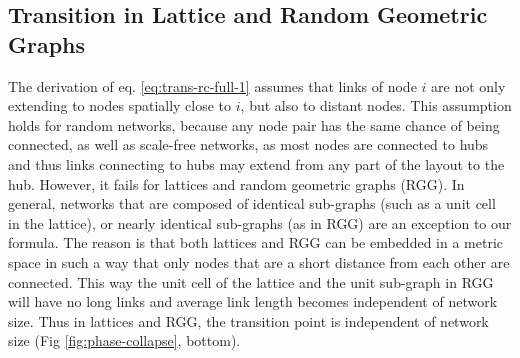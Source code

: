 \documentclass[endfloats,nofootinbib,preprint,floatfix,titlepage,superscriptaddress,linenumbers]{revtex4-1} %
\newcommand{\outNim}[1]{}
\begin{document}
{\outNim{
{\color{red}
Similarly, the width of the transition region around $\rho_c$ can be estimated from the standard deviation $STD[\rho_0(k)]$, again, evaluated using the degree distribution.
}%
}%

\subsection{Transition in Lattice and Random Geometric Graphs}
The derivation of eq. \eqref{eq:trans-rc-full-1} assumes that links of node $i$ are not only extending to nodes spatially close to $i$, but also to distant nodes. %
This assumption holds for random networks, because any node pair has the same chance of being connected,  as well as scale-free networks, as most nodes are connected to hubs and thus links connecting to hubs may extend from any part of the layout to the hub. However, it fails for lattices and random geometric graphs (RGG). 
In general, networks that are composed of identical sub-graphs (such as a unit cell in the lattice), or nearly identical sub-graphs (as in RGG) are an exception to our formula. The reason is that both lattices and RGG can be embedded in a metric space in such a way that only nodes that are a short distance from each other are connected. 
This way the unit cell of the lattice and the unit sub-graph in RGG will have no long links and average link length becomes independent of network size.  
Thus in lattices and RGG, the transition point %
is independent of network size (Fig \ref{fig:phase-collapse}, bottom). 


}
\end{document}
